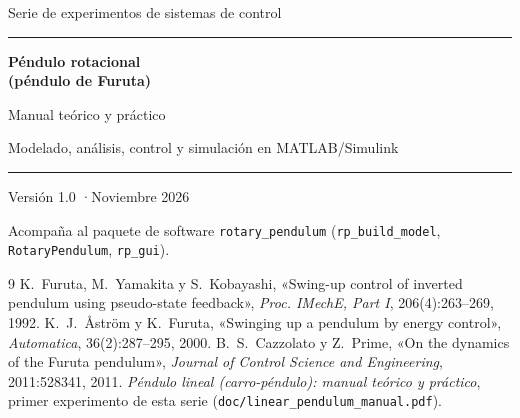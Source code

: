 \documentclass[11pt,a4paper,openany]{report}
\newcounter{practica}
\newcommand{\code}[1]{\texttt{#1}}
\begin{document}
\begin{titlepage}
\centering
\vspace*{1.2cm}
{\large Serie de experimentos de sistemas de control\par}
\vspace{0.4cm}
{\color{c1}\rule{\linewidth}{1.2pt}\par}
\vspace{0.4cm}
{\Huge\bfseries Péndulo rotacional\\[0.2em] (péndulo de Furuta)\par}
\vspace{0.4cm}
{\Large Manual teórico y práctico\par}
\vspace{0.2cm}
{\large Modelado, análisis, control y simulación en MATLAB/Simulink\par}
{\color{c1}\rule{\linewidth}{1.2pt}\par}
\vspace{1.0cm}

\vfill
{\large Versión 1.0 \quad·\quad Noviembre 2026\par}
\vspace{0.6cm}
{\small Acompaña al paquete de software \code{rotary\_pendulum} (\code{rp\_build\_model}, \code{RotaryPendulum}, \code{rp\_gui}).\par}
\end{titlepage}

\tableofcontents
\listoffigures










\appendix


\begin{thebibliography}{9}
 K.~Furuta, M.~Yamakita y S.~Kobayashi, «Swing-up control of inverted pendulum using pseudo-state feedback», \emph{Proc. IMechE, Part I}, 206(4):263--269, 1992.
 K.~J.~Åström y K.~Furuta, «Swinging up a pendulum by energy control», \emph{Automatica}, 36(2):287--295, 2000.
 B.~S.~Cazzolato y Z.~Prime, «On the dynamics of the Furuta pendulum», \emph{Journal of Control Science and Engineering}, 2011:528341, 2011.
 \emph{Péndulo lineal (carro-péndulo): manual teórico y práctico}, primer experimento de esta serie (\code{doc/linear\_pendulum\_manual.pdf}).
\end{thebibliography}
\end{document}
